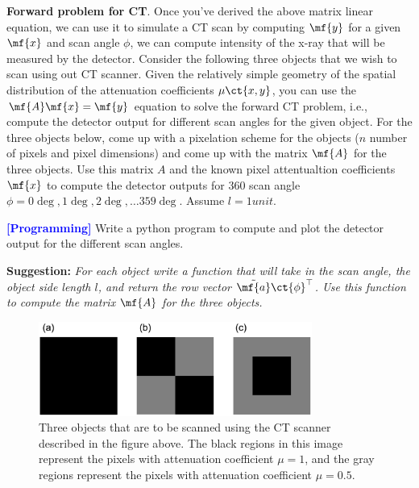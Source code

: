 \begin{enumerate}
    \textbf{Forward problem for CT}. Once you've derived the above matrix linear equation, we can use it to simulate a CT scan by computing $\mf{y}$ for a given $\mf{x}$ and scan angle $\phi$, we can compute intensity of the x-ray that will be measured by the detector. Consider the following three objects that we wish to scan using out CT scanner. Given the relatively simple geometry of the spatial distribution of the attenuation coefficients $\mu\ct{x,y}$, you can use the $\mf{A}\mf{x} = \mf{y}$ equation to solve the forward CT problem, i.e., compute the detector output for different scan angles for the given object. For the three objects below, come up with a pixelation scheme for the objects ($n$ number of pixels and pixel dimensions) and come up with the matrix $\mf{A}$ for the three objects. Use this matrix $A$ and the known pixel attentualtion coefficients $\mf{x}$ to compute the detector outputs for 360 scan angle $\phi = 0\deg, 1\deg, 2\deg, \ldots 359\deg$. Assume $l = 1 unit$.
    
    \textcolor{blue}{\textbf{[Programming]}} Write a python program to compute and plot the detector output for the different scan angles.
    
    \textbf{Suggestion:} \textit{For each object write a function that will take in the scan angle, the object side length $l$, and return the row vector $\tilde{\mf{a}}\ct{\phi}^\top$. Use this function to compute the matrix $\mf{A}$ for the three objects.}
    
    \begin{figure}[h]
        \centering
        \includegraphics[width = 0.8\textwidth]{figure/chapter03/ct_images.png}
        \caption{Three objects that are to be scanned using the CT scanner described in the figure above. The black regions in this image represent the pixels with attenuation coefficient $\mu = 1$, and the gray regions represent the pixels with attenuation coefficient $\mu = 0.5$.}
        \label{fig:ctimages}
    \end{figure}
\end{enumerate}
    